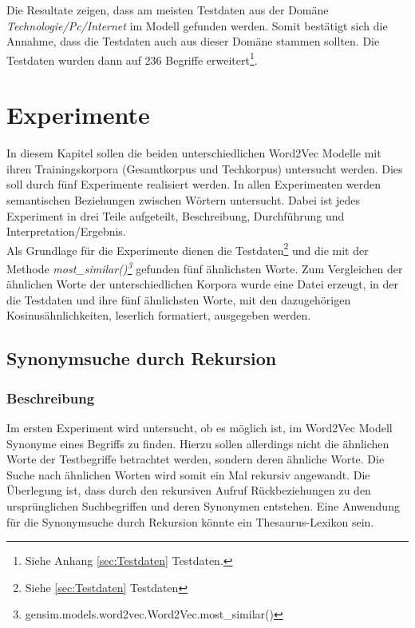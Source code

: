 \documentclass[12pt,a4paper]{report}
\begin{document}
Die Resultate zeigen, dass am meisten Testdaten aus der Domäne \textit{Technologie/Pc/Internet} im Modell gefunden werden.
Somit bestätigt sich die Annahme, dass die Testdaten auch aus dieser Domäne stammen sollten. 
Die Testdaten wurden dann auf 236 Begriffe erweitert\footnote{Siehe Anhang \ref{sec:Testdaten} Testdaten.}.
	
	
\newpage
\chapter{Experimente}
\label{chap:Experimente}
In diesem Kapitel sollen die beiden unterschiedlichen Word2Vec Modelle mit ihren Trainingskorpora (Gesamtkorpus und Techkorpus) untersucht werden. Dies soll durch fünf Experimente realisiert werden. In allen Experimenten werden semantischen Beziehungen zwischen Wörtern untersucht. Dabei ist jedes Experiment in drei Teile aufgeteilt, Beschreibung, Durchführung und Interpretation/Ergebnis.\\
Als Grundlage für die Experimente dienen die Testdaten\footnote{Siehe \ref{sec:Testdaten} Testdaten} und die mit der Methode \textit{most\_similar()\footnote{gensim.models.word2vec.Word2Vec.most\_similar()}} gefunden fünf ähnlichsten Worte. Zum Vergleichen der ähnlichen Worte der unterschiedlichen Korpora wurde eine Datei erzeugt, in der die Testdaten und ihre fünf ähnlichsten Worte, mit den dazugehörigen Kosinusähnlichkeiten, leserlich formatiert, ausgegeben werden.\\ 

	\section{Synonymsuche durch Rekursion}
\label{chap:Experiment1}
		\subsection*{Beschreibung}
		Im ersten Experiment wird untersucht, ob es möglich ist, im Word2Vec Modell Synonyme eines Begriffs zu finden. Hierzu sollen allerdings nicht die ähnlichen Worte der Testbegriffe betrachtet werden, sondern deren ähnliche Worte. Die Suche nach ähnlichen Worten wird somit ein Mal rekursiv angewandt. Die Überlegung ist, dass durch den rekursiven Aufruf Rückbeziehungen zu den ursprünglichen Suchbegriffen und deren Synonymen entstehen. Eine Anwendung für die Synonymsuche durch Rekursion könnte ein Thesaurus-Lexikon sein.\\
		
\end{document}

